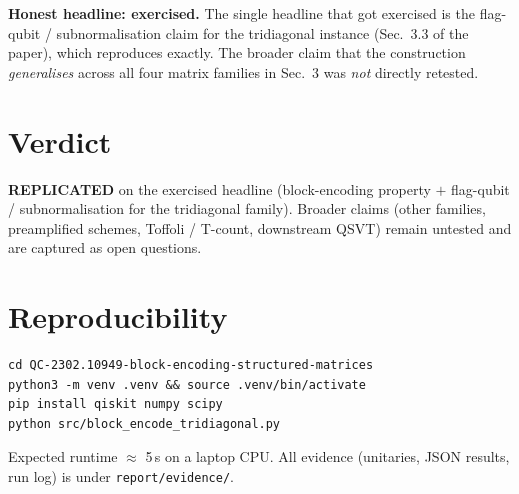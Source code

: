 \documentclass[11pt]{article}
\begin{document}
\textbf{Honest headline: exercised.} The single headline that got
exercised is the flag-qubit / subnormalisation claim for the
tridiagonal instance (Sec.~3.3 of the paper), which reproduces exactly.
The broader claim that the construction \emph{generalises} across all
four matrix families in Sec.~3 was \emph{not} directly retested.

\section{Verdict}
\textbf{REPLICATED} on the exercised headline (block-encoding property
$+$ flag-qubit / subnormalisation for the tridiagonal family). Broader
claims (other families, preamplified schemes, Toffoli / T-count,
downstream QSVT) remain untested and are captured as open questions.



\section*{Reproducibility}
\begin{lstlisting}[basicstyle=\ttfamily\small]
cd QC-2302.10949-block-encoding-structured-matrices
python3 -m venv .venv && source .venv/bin/activate
pip install qiskit numpy scipy
python src/block_encode_tridiagonal.py
\end{lstlisting}
Expected runtime $\approx$ 5\,s on a laptop CPU. All evidence
(unitaries, JSON results, run log) is under \texttt{report/evidence/}.
\end{document}
